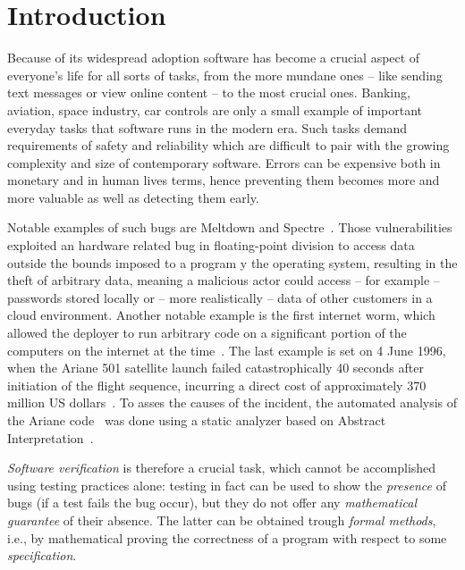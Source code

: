 \chapter*{Introduction}\label{ch:intro}

Because of its widespread adoption software has become a crucial
aspect of everyone's life for all sorts of tasks, from the more
mundane ones -- like sending text messages or view online content --
to the most crucial ones. Banking, aviation, space industry, car
controls are only a small example of important everyday tasks that
software runs in the modern era. Such tasks demand requirements of
safety and reliability which are difficult to pair with the growing
complexity and size of contemporary software. Errors can be expensive
both in monetary and in human lives terms, hence preventing them
becomes more and more valuable as well as detecting them early.

\medskip

Notable examples of such bugs are Meltdown and
Spectre~\cite{art:meltdown,art:spectre}. Those vulnerabilities
exploited an hardware related bug in floating-point division to access
data outside the bounds imposed to a program y the operating system,
resulting in the theft of arbitrary data, meaning a malicious actor
could access -- for example -- passwords stored locally or -- more
realistically -- data of other customers in a cloud environment.
Another notable example is the first internet worm, which allowed the
deployer to run arbitrary code on a significant portion of the
computers on the internet at the
time~\cite{art:worm1,art:worm2,art:worm3,art:worm4}.  The last example
is set on 4 June 1996, when the Ariane 501 satellite launch failed
catastrophically 40 seconds after initiation of the flight sequence,
incurring a direct cost of approximately 370 million US
dollars~\cite{10.1145/251880.251992}. To asses the causes of the
incident, the automated analysis of the Ariane
code~\cite{art:arianecode} was done using a static analyzer based on
Abstract Interpretation~\cite{art:arianeabstract}.

\medskip

\emph{Software verification} is therefore a crucial task, which cannot
be accomplished using testing practices alone: testing in fact can be
used to show the \emph{presence} of bugs (if a test fails the bug
occur), but they do not offer any \emph{mathematical guarantee} of
their absence. The latter can be obtained trough \emph{formal
  methods}, i.e., by mathematical proving the correctness of a program
with respect to some \emph{specification}.

